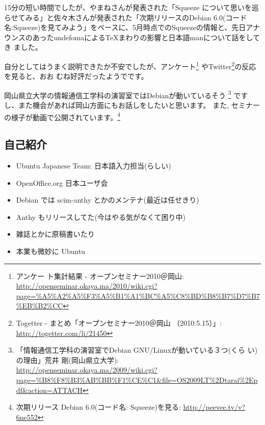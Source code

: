 \documentclass[mingoth,a4paper]{jsarticle}
\begin{document}
15分の短い時間でしたが、やまねさんが発表された「Squeeze について思いを巡
らせてみる」と佐々木さんが発表された「次期リリースのDebian 6.0(コード
名:Squeeze)を見てみよう」をベースに、5月時点でのSqueezeの情報と、先日アナ
ウンスのあったundefomaによるTeXまわりの影響と日本語manについて話をしてき
ました。

自分としてはうまく説明できたか不安でしたが、アンケート\footnote{アンケー
ト集計結果 - オープンセミナー2010＠岡山:
\url{http://openseminar.okaya.ma/2010/wiki.cgi?page=\%A5\%A2\%A5\%F3\%A5\%B1\%A1\%BC\%A5\%C8\%BD\%B8\%B7\%D7\%B7\%EB\%B2\%CC}}
やTwitter\footnote{ Togetter - まとめ「オープンセミナー2010＠岡山
（2010.5.15）」: \url{http://togetter.com/li/21450}}の反応を見ると、おお
むね好評だったようでです。

岡山県立大学の情報通信工学科の演習室ではDebianが動いているそう
\footnote{「情報通信工学科の演習室でDebian GNU/Linuxが動いている３つ(くら
い)の理由」荒井 剛(岡山県立大学):
\url{http://openseminar.okaya.ma/2009/wiki.cgi?page=\%B8\%F8\%B3\%AB\%BB\%F1\%CE\%C1&file=OS2009LT\%2Dtarai\%2Epdf&action=ATTACH}}
ですし、また機会があれば岡山方面にもお話しをしたいと思います。
また, 
セミナーの様子が動画で公開されています。\footnote{次期リリース Debian
6.0(コード名: Squeeze)を見る: \url{http://peevee.tv/v?6ne552}}


\subsection{自己紹介}

\begin{itemize}
      \item Ubuntu Japanese Team: 日本語入力担当(らしい)
      \item OpenOffice.org 日本ユーザ会
      \item Debian では scim-anthy とかのメンテナ(最近は任せきり)
      \item Anthy もリリースしてた(今はやる気がなくて困り中)
      \item 雑誌とかに原稿書いたり
      \item 本業も微妙に Ubuntu
\end{itemize}
\end{document}
